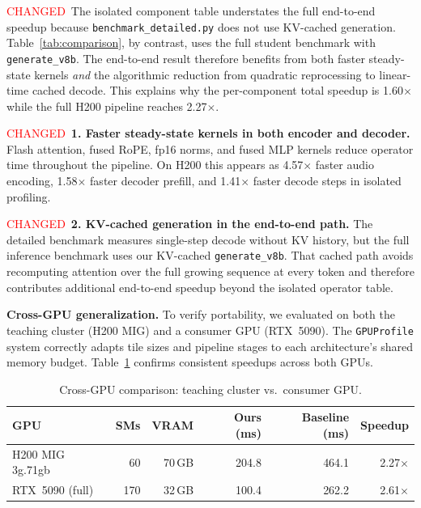 \documentclass{article}
\newcommand{\chg}[1]{{\color{blue}#1}}
\newcommand{\chglabel}{{\setlength{\fboxsep}{1pt}\colorbox{yellow!45}{\textcolor{red}{\scriptsize CHANGED}}}}
\begin{document}
\chglabel\ \chg{The isolated component table understates the full end-to-end speedup because \texttt{benchmark\_detailed.py} does not use KV-cached generation.  Table~\ref{tab:comparison}, by contrast, uses the full student benchmark with \texttt{generate\_v8b}.  The end-to-end result therefore benefits from both faster steady-state kernels \emph{and} the algorithmic reduction from quadratic reprocessing to linear-time cached decode.  This explains why the per-component total speedup is 1.60$\times$ while the full H200 pipeline reaches 2.27$\times$.}

\chglabel\ \chg{\textbf{1. Faster steady-state kernels in both encoder and decoder.}
Flash attention, fused RoPE, fp16 norms, and fused MLP kernels reduce operator time throughout the pipeline.  On H200 this appears as 4.57$\times$ faster audio encoding, 1.58$\times$ faster decoder prefill, and 1.41$\times$ faster decode steps in isolated profiling.}

\chglabel\ \chg{\textbf{2. KV-cached generation in the end-to-end path.}
The detailed benchmark measures single-step decode without KV history, but the full inference benchmark uses our KV-cached \texttt{generate\_v8b}.  That cached path avoids recomputing attention over the full growing sequence at every token and therefore contributes additional end-to-end speedup beyond the isolated operator table.}

\textbf{Cross-GPU generalization.}
To verify portability, we evaluated on both the teaching cluster (H200 MIG) and a consumer GPU (RTX~5090).
The \texttt{GPUProfile} system correctly adapts tile sizes and pipeline stages to each architecture's shared memory budget.
Table~\ref{tab:crossgpu_main} confirms consistent speedups across both GPUs.

\begin{table}[h]
\centering
\caption{Cross-GPU comparison: teaching cluster vs.\ consumer GPU.}
\label{tab:crossgpu_main}
\small
\begin{tabular}{@{}lrrrrr@{}}
\toprule
\textbf{GPU} & \textbf{SMs} & \textbf{VRAM} & \textbf{Ours (ms)} & \textbf{Baseline (ms)} & \textbf{Speedup} \\
\midrule
H200 MIG 3g.71gb & 60 & 70\,GB & 204.8 & 464.1 & 2.27$\times$ \\
RTX~5090 (full) & 170 & 32\,GB & 100.4 & 262.2 & 2.61$\times$ \\
\bottomrule
\end{tabular}
\end{table}
\end{document}
